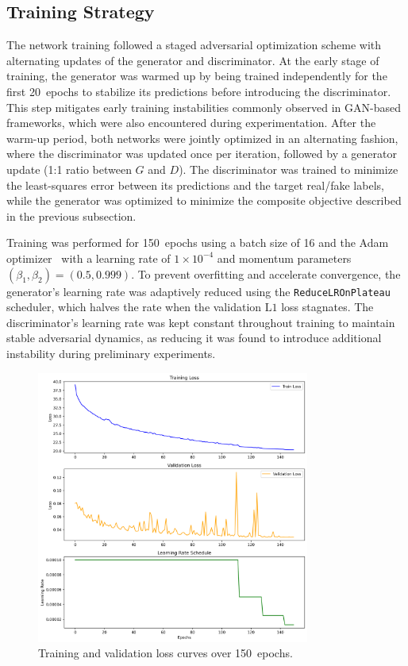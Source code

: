 \subsection{Training Strategy}
The network training followed a staged adversarial optimization scheme with alternating updates of the generator and discriminator. At the early stage of training, the generator was warmed up by being trained independently for the first 20~epochs to stabilize its predictions before introducing the discriminator. This step mitigates early training instabilities commonly observed in GAN-based frameworks, which were also encountered during experimentation. After the warm-up period, both networks were jointly optimized in an alternating fashion, where the discriminator was updated once per iteration, followed by a generator update (1:1 ratio between $G$ and $D$). The discriminator was trained to minimize the least-squares error between its predictions and the target real/fake labels, while the generator was optimized to minimize the composite objective described in the previous subsection.

Training was performed for 150~epochs using a batch size of 16 and the Adam optimizer~\cite{adam_optimizer_2017} with a learning rate of $1\times10^{-4}$ and momentum parameters $(\beta_1, \beta_2) = (0.5, 0.999)$. To prevent overfitting and accelerate convergence, the generator’s learning rate was adaptively reduced using the \texttt{ReduceLROnPlateau} scheduler, which halves the rate when the validation $\mathrm{L1}$ loss stagnates. The discriminator’s learning rate was kept constant throughout training to maintain stable adversarial dynamics, as reducing it was found to introduce additional instability during preliminary experiments.

\begin{figure}[h!]
    \centering
    \includegraphics[width=0.8\textwidth,height=0.65\textheight]{img/training_curves.png}
    \caption{Training and validation loss curves over 150~epochs.}
    \label{fig:training_curve}
\end{figure}

